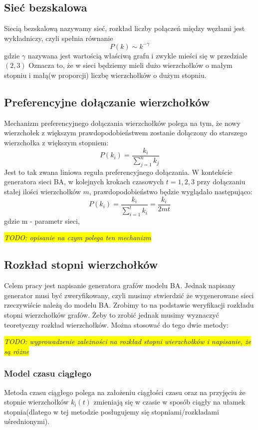 \documentclass{article}
\newcommand{\todo}[1]{
	\colorbox{yellow} {{\color{red}
	\emph {TODO: #1}
}}}
\begin{document}
\subsection{Sieć bezskalowa}
Siecią bezskalową nazywamy sieć, rozkład liczby połączeń między węzłami jest wykładniczy, czyli spełnia równanie 
	\begin{equation}
		P(k) \sim k^{-\gamma}
	\end{equation}
gdzie $\gamma$ nazywana jest wartością właściwą grafu i zwykle mieści się w przedziale $ (2,3)$  
Oznacza to, że w sieci będziemy mieli dużo wierzchołków o małym stopniu i małą(w proporcji) liczbę wierzchołków o dużym stopniu.
\subsection{Preferencyjne dołączanie wierzchołków}
Mechanizm preferencyjnego dołączania wierzchołków polega na tym, że nowy wierzchołek z większym prawdopodobieństwem zostanie dołączony do starszego wierzchołka z większym stopniem:
\begin{equation}
	P(k_i) = \frac{k_i}{ \sum_{ j = 1 }^{n} k_j }
\end{equation}
Jest to tak zwana liniowa reguła preferencyjnego dołączania. W kontekście generatora sieci BA, w kolejnych krokach czasowych $t = 1,2,3$ przy dołączaniu stałej ilości wierzchołków $m$, prawdopodobieństwo będzie wyglądało następująco:
\begin{equation}
	P(k_i) = \frac{k_i}{ \sum_{ i = 1 }^{t} k_i } = \frac{k_i} {2mt}
\end{equation}
	gdzie m - parametr sieci, 
	\todo{opisanie na czym polega ten mechanizm}
\subsection{Rozkład stopni wierzchołków}
	Celem pracy jest napisanie generatora grafów modelu BA. Jednak napisany generator musi być zweryfikowany, czyli musimy stwierdzić że wygenerowane sieci rzeczywiście należą do modelu BA. Zrobimy to na podstawie weryfikacji rozkładu stopni wierzchołków grafów. Żeby to zrobić jednak musimy wyznaczyć teoretyczny rozkład wierzchołków. Można stosować do tego dwie metody:
	\todo{wyprowadzenie zależności na rozkład stopni wierzchołków i napisanie, że są różne}
\subsubsection{Model czasu ciągłego}
	Metoda czasu ciągłego polega na założeniu ciągłości czasu oraz na przyjęciu że stopnie wierzchołków $k_i(t)$ zmieniają się w czasie w sposób ciągły na ułamek stopnia(dlatego w tej metodzie posługujemy się stopniami/rozkładami uśrednionymi).
\end{document}
